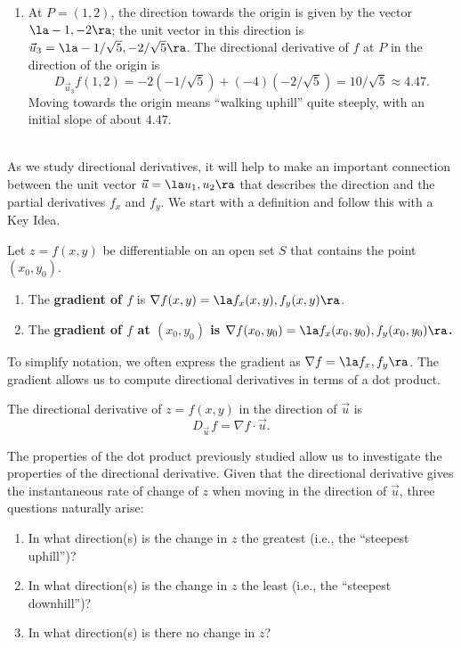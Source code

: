 {\begin{enumerate}
	Finding these directions of ``no elevation change'' is important.
	
	\item		At $P=(1,2)$, the direction towards the origin is given by the vector $\la -1,-2\ra$; the unit vector in this direction is $\vec u_3=\la -1/\sqrt{5},-2/\sqrt{5}\ra$. The directional derivative of $f$ at $P$ in the direction of the origin is
	$$D_{\vec u_3}f(1,2) = -2(-1/\sqrt{5}) + (-4)(-2/\sqrt{5}) = 10/\sqrt{5} \approx 4.47.$$
	Moving towards the origin means ``walking uphill'' quite steeply, with an initial slope of about $4.47$.
\end{enumerate}
\baselineskip
}\\

As we study directional derivatives, it will help to make an important connection between the unit vector $\vec u = \la u_1,u_2\ra$ that describes the direction and the partial derivatives $f_x$ and $f_y$. We start with a definition and follow this with a Key Idea.

{Let $z=f(x,y)$ be differentiable on an open set $S$ that contains the point $(x_0,y_0)$.
\begin{enumerate}
	\item The \textbf{gradient of $f$} is $\nabla f(x,y) = \la f_x(x,y),f_y(x,y)\ra$.
	\item The \textbf{gradient of $f$ at $(x_0,y_0)$ is $\nabla f(x_0,y_0) = \la f_x(x_0,y_0),f_y(x_0,y_0)\ra$.}
\end{enumerate}
}


To simplify notation, we often express the gradient as $\nabla f = \la f_x, f_y\ra$. The gradient allows us to compute directional derivatives in terms of a dot product.

{%
The directional derivative of $z=f(x,y)$ in the direction of $\vec u$ is
$$D_{\vec u\,}f = \nabla f\cdot \vec u.$$
}

The properties of the dot product previously studied allow us to investigate the properties of the directional derivative. Given that the directional derivative gives the instantaneous rate of change of $z$ when moving in the direction of $\vec u$, three questions naturally arise:
\begin{enumerate}
	\item In what direction(s) is the change in $z$ the greatest (i.e., the ``steepest uphill'')?
	\item In what direction(s) is the change in $z$ the least (i.e.,  the ``steepest downhill'')?
	\item In what direction(s) is there no change in $z$?
\end{enumerate}

